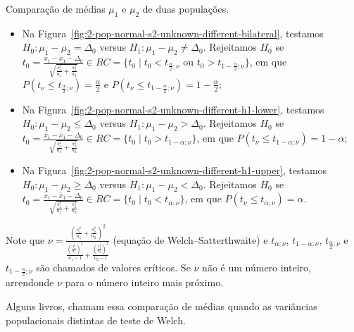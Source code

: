 \documentclass[9pt]{beamer}
\begin{document}
\begin{frame}{Comparação de médias $\mu_1$ e $\mu_2$ de duas populações.}

\footnotesize

\begin{itemize}
	\item Na Figura~\ref{fig:2-pop-normal-s2-unknown-different-bilateral}, testamos $H_0: \mu_1 - \mu_2 = \Delta_0$ versus $H_1: \mu_1 - \mu_2 \neq \Delta_0$. Rejeitamos $H_0$ se $t_0 = \frac{\bar{x}_1 - \bar{x}_1 - \Delta_0}{ \sqrt{ \frac{s_1^2}{n_1} + \frac{s_2^2}{n_2} } } \in  RC=\{t_0 \mid t_0 < t_{\frac{\alpha}{2};\nu} \allowbreak \mbox{ ou } t_0 > t_{1-\frac{\alpha}{2};\nu} \}$, em que $P\left(t_{\nu} \leq t_{\frac{\alpha}{2}; \nu} \right) = \frac{\alpha}{2}$ e $P\left(t_{\nu} \leq t_{1-\frac{\alpha}{2}; \nu} \right) = 1 - \frac{\alpha}{2}$;
	\vfill
	
	\item Na Figura~\ref{fig:2-pop-normal-s2-unknown-different-h1-lower}, testamos $H_0: \mu_1 - \mu_2 \leq \Delta_0 $ versus $H_1: \mu_1 - \mu_2 > \Delta_0$. Rejeitamos $H_0$ se $t_0 = \frac{\bar{x}_1 - \bar{x}_1 - \Delta_0}{ \sqrt{ \frac{s_1^2}{n_1} + \frac{s_2^2}{n_2} } } \in \allowbreak RC=\{t_0 \mid t_0 > t_{1-\alpha; \nu}  \}$, em que $P\left(t_{\nu} \leq  t_{1-\alpha;\nu} \right) =1- \alpha$;
	\vfill
	
	\item Na Figura~\ref{fig:2-pop-normal-s2-unknown-different-h1-upper}, testamos $H_0: \mu_1 - \mu_2 \geq \Delta_0$ versus $H_1: \mu_1 - \mu_2  < \Delta_0$. Rejeitamos $H_0$ se $t_0 = \frac{\bar{x}_1 - \bar{x}_1 - \Delta_0}{ \sqrt{ \frac{s_1^2}{n_1} + \frac{s_2^2}{n_2} } } \in \allowbreak RC=\{t_0 \mid t_0 < t_{\alpha;\nu}  \}$, em que $P\left(t_{\nu} \leq t_{\alpha;\nu} \right) = \alpha$.
\end{itemize}
Note que $\nu = \frac{\left( \frac{s_1^2}{n_1} + \frac{s_2^2}{n_2} \right)^2}{ \frac{\left( \frac{s_1^2}{n_1} \right)^2}{n_1-1} + \frac{\left( \frac{s_2^2}{n_2} \right)^2}{n_2-1} }$ (equação de Welch–Satterthwaite) e $t_{\alpha;\nu}$, $t_{1-\alpha;\nu}$, $t_{\frac{\alpha}{2};\nu}$ e $t_{1-\frac{\alpha}{2};\nu}$ são chamados de valores críticos. Se $\nu$ não é um número inteiro, arrendonde $\nu$ para o número inteiro mais próximo.

Alguns livros, chamam essa comparação de médias quando as variâncias populacionais distintas de teste de Welch.

\normalsize

\end{frame}
\end{document}
